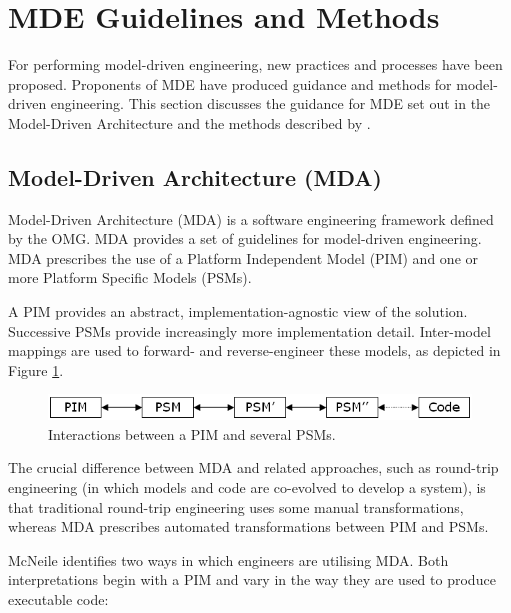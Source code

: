 
\section{MDE Guidelines and Methods}
\label{sec:mde_methods}
For performing model-driven engineering, new practices and processes have been proposed. Proponents of MDE have produced guidance and methods for model-driven engineering. This section discusses the guidance for MDE set out in the Model-Driven Architecture \cite{mda} and the methods described by \cite{stahl06mdsd,kelly08dsm,greenfield04software}. 

\subsection{Model-Driven Architecture (MDA)}
Model-Driven Architecture (MDA) is a software engineering framework defined by the OMG. MDA provides a set of guidelines for model-driven engineering. MDA prescribes the use of a Platform Independent Model (PIM) and one or more Platform Specific Models (PSMs).

A PIM provides an abstract, implementation-agnostic view of the solution. Successive PSMs provide increasingly more implementation detail. Inter-model mappings are used to forward- and reverse-engineer these models, as depicted in
Figure \ref{fig:mda}.

\begin{figure}[htbp]
  \begin{center}
    \leavevmode
    \includegraphics[scale=0.5]{2.Background/images/PIMs_and_PSMs.png}
  \end{center}
  \caption{Interactions between a PIM and several PSMs.}
  \label{fig:mda}
\end{figure}

The crucial difference between MDA and related approaches, such as round-trip engineering (in which models and code are co-evolved to develop a system), is that traditional round-trip engineering uses some manual transformations, whereas MDA prescribes automated transformations between PIM and PSMs.

McNeile \cite{mcneile03mda} identifies two ways in which engineers are utilising MDA. Both interpretations begin with a PIM and vary in the way they are used to produce executable code:

